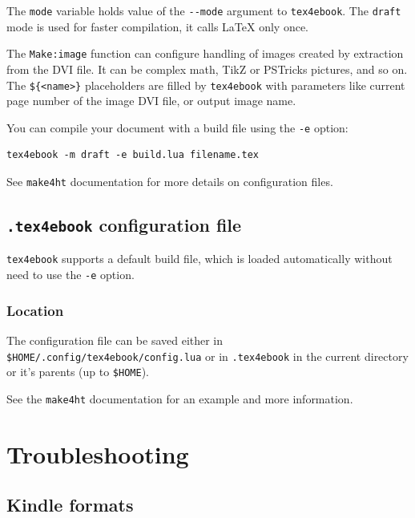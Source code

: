 The \texttt{mode} variable holds value of the \texttt{-\/-mode} argument
to \texttt{tex4ebook}. The \texttt{draft} mode is used for faster
compilation, it calls LaTeX only once.

The \texttt{Make:image} function can configure handling of images
created by extraction from the DVI file. It can be complex math, TikZ or
PSTricks pictures, and so on. The
\texttt{\$\{\textless{}name\textgreater{}\}} placeholders are filled by
\texttt{tex4ebook} with parameters like current page number of the image
DVI file, or output image name.

You can compile your document with a build file using the \texttt{-e}
option:

\begin{verbatim}
tex4ebook -m draft -e build.lua filename.tex
\end{verbatim}

See \texttt{make4ht} documentation for more details on configuration
files.

\hypertarget{tex4ebook-configuration-file}{%
\subsection{\texorpdfstring{\texttt{.tex4ebook} configuration
file}{.tex4ebook configuration file}}\label{tex4ebook-configuration-file}}

\texttt{tex4ebook} supports a default build file, which is loaded
automatically without need to use the \texttt{-e} option.

\hypertarget{location}{%
\subsubsection{Location}\label{location}}

The configuration file can be saved either in
\texttt{\$HOME/.config/tex4ebook/config.lua} or in \texttt{.tex4ebook}
in the current directory or it's parents (up to \texttt{\$HOME}).

See the \texttt{make4ht} documentation for an example and more
information.

\hypertarget{troubleshooting}{%
\section{Troubleshooting}\label{troubleshooting}}

\hypertarget{kindle-formats}{%
\subsection{Kindle formats}\label{kindle-formats}}

